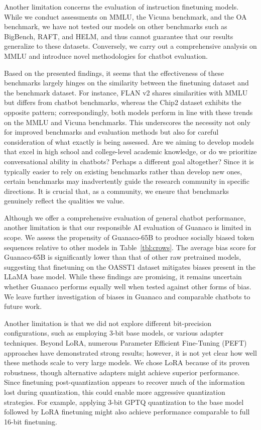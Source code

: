 Another limitation concerns the evaluation of instruction finetuning models. While we conduct assessments on MMLU, the Vicuna benchmark, and the OA benchmark, we have not tested our models on other benchmarks such as BigBench, RAFT, and HELM, and thus cannot guarantee that our results generalize to these datasets. Conversely, we carry out a comprehensive analysis on MMLU and introduce novel methodologies for chatbot evaluation.

Based on the presented findings, it seems that the effectiveness of these benchmarks largely hinges on the similarity between the finetuning dataset and the benchmark dataset. For instance, FLAN v2 shares similarities with MMLU but differs from chatbot benchmarks, whereas the Chip2 dataset exhibits the opposite pattern; correspondingly, both models perform in line with these trends on the MMLU and Vicuna benchmarks. This underscores the necessity not only for improved benchmarks and evaluation methods but also for careful consideration of what exactly is being assessed. Are we aiming to develop models that excel in high school and college-level academic knowledge, or do we prioritize conversational ability in chatbots? Perhaps a different goal altogether? Since it is typically easier to rely on existing benchmarks rather than develop new ones, certain benchmarks may inadvertently guide the research community in specific directions. It is crucial that, as a community, we ensure that benchmarks genuinely reflect the qualities we value.

Although we offer a comprehensive evaluation of general chatbot performance, another limitation is that our responsible AI evaluation of {Guanaco} is limited in scope. We assess the propensity of {Guanaco}-65B to produce socially biased token sequences relative to other models in Table~\ref{tbl:crows}. The average bias score for {Guanaco}-65B is significantly lower than that of other raw pretrained models, suggesting that finetuning on the OASST1 dataset mitigates biases present in the LLaMA base model. While these findings are promising, it remains uncertain whether {Guanaco} performs equally well when tested against other forms of bias. We leave further investigation of biases in {Guanaco} and comparable chatbots to future work.

Another limitation is that we did not explore different bit-precision configurations, such as employing 3-bit base models, or various adapter techniques. Beyond LoRA, numerous Parameter Efficient Fine-Tuning (PEFT) approaches have demonstrated strong results; however, it is not yet clear how well these methods scale to very large models. We chose LoRA because of its proven robustness, though alternative adapters might achieve superior performance. Since finetuning post-quantization appears to recover much of the information lost during quantization, this could enable more aggressive quantization strategies. For example, applying 3-bit GPTQ quantization to the base model followed by LoRA finetuning might also achieve performance comparable to full 16-bit finetuning.

